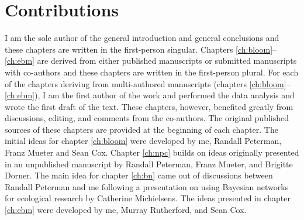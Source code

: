 \section{Contributions}

I am the sole author of the general introduction and general conclusions and
these chapters are written in the first-person singular. Chapters
\ref{ch:bloom}--\ref{ch:ebm} are derived from either published manuscripts or
submitted manuscripts with co-authors and these chapters are written in the
first-person plural. For each of the chapters deriving from multi-authored
manuscripts (chapters \ref{ch:bloom}--\ref{ch:ebm}), I am the first author of
the work and performed the data analysis and wrote the first draft of the text.
These chapters, however, benefited greatly from discussions, editing, and
comments from the co-authors. The original published sources of these chapters
are provided at the beginning of each chapter. The initial ideas for chapter
\ref{ch:bloom} were developed by me, Randall Peterman, Franz Mueter and Sean
Cox. Chapter \ref{ch:npc} builds on ideas originally presented in an unpublished
manuscript by Randall Peterman, Franz Mueter, and Brigitte Dorner. The main idea
for chapter \ref{ch:bn} came out of discussions between Randall Peterman and me
following a presentation on using Bayesian networks for ecological research by
Catherine Michielsens. The ideas presented in chapter \ref{ch:ebm} were
developed by me, Murray Rutherford, and Sean Cox.
